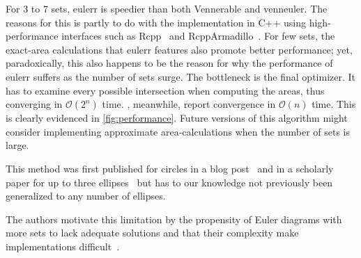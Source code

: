\documentclass[
  oneside,
  usegeometry,
  numbers=noendperiod,
  openany,
  parskip=half
]{scrbook}\usepackage[]{graphicx}\usepackage{xcolor}
\newcommand{\pkg}[1]{{\fontseries{b}\selectfont #1}}
\begin{document}
For 3 to 7 sets, \pkg{eulerr} is speedier than both \pkg{Vennerable} and \pkg{venneuler}. The reasons for this is partly to do with the implementation in C++ using high-performance interfaces such as \pkg{Rcpp}~\citep{eddelbuettel_2011} and \pkg{RcppArmadillo}~\citep{eddelbuettel_2014}. For few sets, the exact-area calculations that \pkg{eulerr} features also promote better performance; yet, paradoxically, this also happens to be the reason for why the performance of \pkg{eulerr} suffers as the number of sets surge. The bottleneck is the final optimizer. It has to examine every possible intersection when computing the areas, thus converging in $\mathcal{O}(2^n)$ time. \citet{wilkinson_2012}, meanwhile, report convergence in $\mathcal{O}(n)$ time. This is clearly evidenced in \cref{fig:performance}. Future versions of this algorithm might consider implementing approximate area-calculations when the number of sets is large.

This method was first published for circles in a blog post~\citep{frederickson_2013} and in a scholarly paper for up to three ellipses~\citep{micallef_2013} but has to our knowledge not previously been generalized to any number of ellipses.

The authors motivate this limitation by the propensity of Euler diagrams with more sets to lack adequate solutions and that their complexity make implementations difficult~\citep{micallef_2013}.
\end{document}

